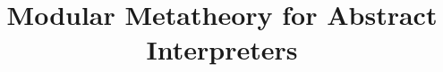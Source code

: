 \documentclass[pldi]{sigplanconf}
\begin{document}
\title{Modular Metatheory for Abstract Interpreters}
\maketitle



\end{document}
